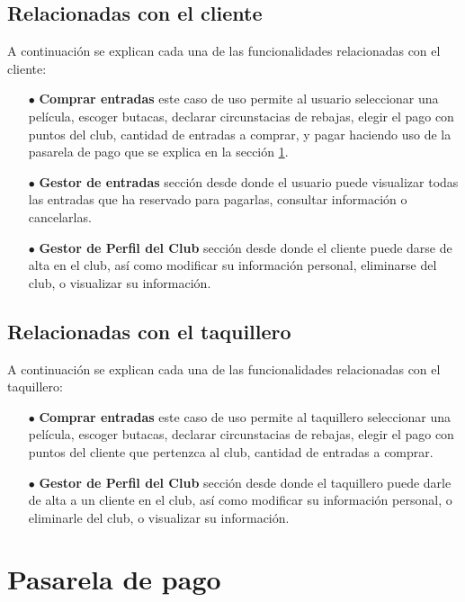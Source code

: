 \subsection{Relacionadas con el cliente}

A continuación se explican cada una de las funcionalidades relacionadas con el cliente:

\begin{enumerate}
    \item[$\bullet$] \textbf{Comprar entradas} este caso de uso permite al usuario seleccionar una película, escoger butacas, declarar circunstacias de rebajas, elegir el pago con puntos del club, cantidad de entradas a comprar, y pagar haciendo uso de la pasarela de pago que se explica en la sección \ref{sc:pago}.
    \item[$\bullet$] \textbf{Gestor de entradas} sección desde donde el usuario puede visualizar todas las entradas que ha reservado para pagarlas, consultar información o cancelarlas.
    \item[$\bullet$] \textbf{Gestor de Perfil del Club} sección desde donde el cliente puede darse de alta en el club, así como modificar su información personal, eliminarse del club, o visualizar su información.
\end{enumerate}

\subsection{Relacionadas con el taquillero}

A continuación se explican cada una de las funcionalidades relacionadas con el taquillero:

\begin{enumerate}
    \item[$\bullet$] \textbf{Comprar entradas} este caso de uso permite al taquillero seleccionar una película, escoger butacas, declarar circunstacias de rebajas, elegir el pago con puntos del cliente que pertenzca al club, cantidad de entradas a comprar.
    \item[$\bullet$] \textbf{Gestor de Perfil del Club} sección desde donde el taquillero puede darle de alta a un cliente en el club, así como modificar su información personal, o eliminarle del club, o visualizar su información.
\end{enumerate}

\section{Pasarela de pago}\label{sc:pago}

